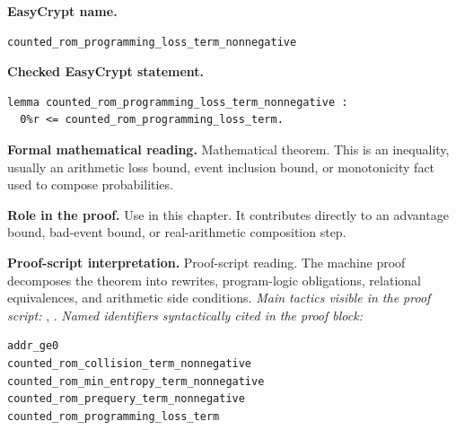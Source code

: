\begin{formaltheorem}
\noindent\textbf{EasyCrypt name.}
\begin{lstlisting}[language=EasyCrypt,basicstyle=\ttfamily\scriptsize]
counted_rom_programming_loss_term_nonnegative
\end{lstlisting}
\noindent\textbf{Checked EasyCrypt statement.}
\begin{lstlisting}[language=EasyCrypt,basicstyle=\ttfamily\scriptsize]
lemma counted_rom_programming_loss_term_nonnegative :
  0%r <= counted_rom_programming_loss_term.
\end{lstlisting}
\noindent\textbf{Formal mathematical reading.}
Mathematical theorem. This is an inequality, usually an arithmetic loss bound, event inclusion bound, or monotonicity fact used to compose probabilities.

\noindent\textbf{Role in the proof.}
Use in this chapter. It contributes directly to an advantage bound, bad-event bound, or real-arithmetic composition step.

\noindent\textbf{Proof-script interpretation.}
Proof-script reading. The machine proof decomposes the theorem into rewrites, program-logic obligations, relational equivalences, and arithmetic side conditions.
\emph{Main tactics visible in the proof script:} , .
\emph{Named identifiers syntactically cited in the proof block:}
\begin{lstlisting}[language=EasyCrypt,basicstyle=\ttfamily\scriptsize]
addr_ge0
counted_rom_collision_term_nonnegative
counted_rom_min_entropy_term_nonnegative
counted_rom_prequery_term_nonnegative
counted_rom_programming_loss_term
\end{lstlisting}

\end{formaltheorem}

